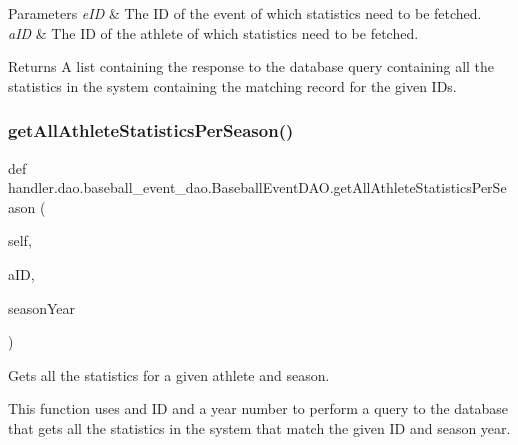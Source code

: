\begin{DoxyParams}{Parameters}
{\em e\+ID} & The ID of the event of which statistics need to be fetched. \\
\hline
{\em a\+ID} & The ID of the athlete of which statistics need to be fetched.\\
\hline
\end{DoxyParams}
\begin{DoxyReturn}{Returns}
A list containing the response to the database query containing all the statistics in the system containing the matching record for the given I\+Ds. 
\end{DoxyReturn}
\mbox{\label{classhandler_1_1dao_1_1baseball__event__dao_1_1_baseball_event_d_a_o_a064c4288059d76d42b4ea25956177934}} 
\subsubsection{\texorpdfstring{get\+All\+Athlete\+Statistics\+Per\+Season()}{getAllAthleteStatisticsPerSeason()}}
{\footnotesize\ttfamily def handler.\+dao.\+baseball\+\_\+event\+\_\+dao.\+Baseball\+Event\+D\+A\+O.\+get\+All\+Athlete\+Statistics\+Per\+Season (\begin{DoxyParamCaption}\item[{}]{self,  }\item[{}]{a\+ID,  }\item[{}]{season\+Year }\end{DoxyParamCaption})}



Gets all the statistics for a given athlete and season. 

This function uses and ID and a year number to perform a query to the database that gets all the statistics in the system that match the given ID and season year.


